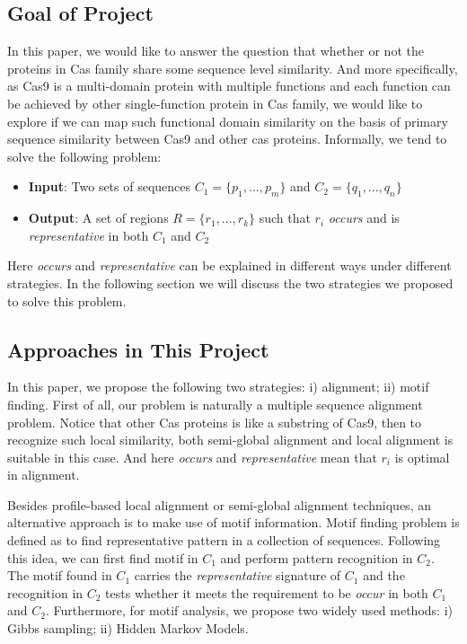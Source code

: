 \documentclass[11pt, oneside]{article}
\begin{document}
\subsection{Goal of Project}

In this paper, we would like to answer the question that whether or not the proteins in Cas family share some sequence level similarity. And more specifically, as Cas9 is a multi-domain protein with multiple functions and each function can be achieved by other single-function protein in Cas family, we would like to explore if we can map such functional domain similarity on the basis of primary sequence similarity between Cas9 and other cas proteins. Informally, we tend to solve the following problem:
\begin{itemize}
	\item \textbf{Input}: Two sets of sequences $C_1 = \{p_1, ..., p_m\}$ and $C_2 = \{q_1, ..., q_n\}$
	\item \textbf{Output}: A set of regions $R = \{r_1, ..., r_k\}$ such that $r_i$ \textit{occurs} and is \textit{representative} in both $C_1$ and $C_2$ 
\end{itemize}
Here \textit{occurs} and \textit{representative} can be explained in different ways under different strategies. In the following section we will discuss the two strategies we proposed to solve this problem.

\subsection{Approaches in This Project}

In this paper, we propose the following two strategies: i) alignment; ii) motif finding. First of all, our problem is naturally a multiple sequence alignment problem. Notice that other Cas proteins is like a substring of Cas9, then to recognize such local similarity, both semi-global alignment and local alignment is suitable in this case. And here \textit{occurs} and \textit{representative} mean that $r_i$ is optimal in alignment.  

Besides profile-based local alignment or semi-global alignment techniques, an alternative approach is to make use of motif information. Motif finding problem is defined as to find representative pattern in a collection of sequences. Following this idea, we can first find motif in $C_1$ and perform pattern recognition in $C_2$. The motif found in $C_1$ carries the \textit{representative} signature of $C_1$ and the recognition in $C_2$ tests whether it meets the requirement to be \textit{occur} in both $C_1$ and $C_2$. Furthermore, for motif analysis, we propose two widely used methods: i) Gibbs sampling; ii) Hidden Markov Models. 
\end{document}
